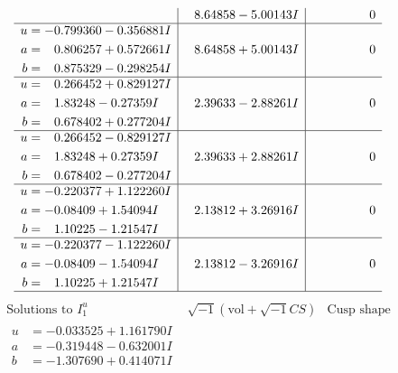 \documentclass[1p]{elsarticle_modified}
\theoremstyle{definition}
\newcommand{\I}{\sqrt{-1}}
\begin{document}
$$\begin{array}{c|c|c}
 & \phantom{-}8.64858 - 5.00143 I & \phantom{-0.000000 } 0 \\ \hline\begin{aligned}
u &= -0.799360 - 0.356881 I \\
a &= \phantom{-}0.806257 + 0.572661 I \\
b &= \phantom{-}0.875329 - 0.298254 I\end{aligned}
 & \phantom{-}8.64858 + 5.00143 I & \phantom{-0.000000 } 0 \\ \hline\begin{aligned}
u &= \phantom{-}0.266452 + 0.829127 I \\
a &= \phantom{-}1.83248 - 0.27359 I \\
b &= \phantom{-}0.678402 + 0.277204 I\end{aligned}
 & \phantom{-}2.39633 - 2.88261 I & \phantom{-0.000000 } 0 \\ \hline\begin{aligned}
u &= \phantom{-}0.266452 - 0.829127 I \\
a &= \phantom{-}1.83248 + 0.27359 I \\
b &= \phantom{-}0.678402 - 0.277204 I\end{aligned}
 & \phantom{-}2.39633 + 2.88261 I & \phantom{-0.000000 } 0 \\ \hline\begin{aligned}
u &= -0.220377 + 1.122260 I \\
a &= -0.08409 + 1.54094 I \\
b &= \phantom{-}1.10225 - 1.21547 I\end{aligned}
 & \phantom{-}2.13812 + 3.26916 I & \phantom{-0.000000 } 0 \\ \hline\begin{aligned}
u &= -0.220377 - 1.122260 I \\
a &= -0.08409 - 1.54094 I \\
b &= \phantom{-}1.10225 + 1.21547 I\end{aligned}
 & \phantom{-}2.13812 - 3.26916 I & \phantom{-0.000000 } 0\\
 \hline 
 \end{array}$$\newpage$$\begin{array}{c|c|c}  
\text{Solutions to }I^u_{1}& \I (\text{vol} + \sqrt{-1}CS) & \text{Cusp shape}\\
 \hline 
\begin{aligned}
u &= -0.033525 + 1.161790 I \\
a &= -0.319448 - 0.632001 I \\
b &= -1.307690 + 0.414071 I\end{aligned}

\end{array}$$
\end{document}
